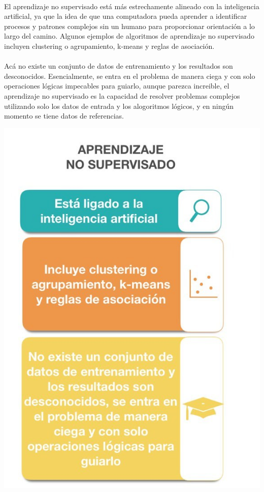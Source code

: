 \documentclass[11pt,a4paper]{article}
\begin{document}
		\\El aprendizaje no supervisado está más estrechamente alineado con la inteligencia artificial, ya que la idea de que una computadora pueda aprender a identificar procesos y patrones complejos sin un humano para proporcionar orientación a lo largo del camino. Algunos ejemplos de algoritmos de aprendizaje no supervisado incluyen clustering o agrupamiento, k-means y reglas de asociación.\\

        \\Acá no existe un conjunto de datos de entrenamiento y los resultados son desconocidos. Esencialmente, se entra en el problema de manera ciega y con solo operaciones lógicas impecables para guiarlo, aunque parezca increible, el aprendizaje no supervisado es la capacidad de resolver problemas complejos utilizando solo los datos de entrada y los alogoritmos lógicos, y en ningún momento se tiene datos de referencias.\\
		
		\begin{center}
		\includegraphics[scale=1.0]{./Imagenes/AprendisajeNoSupervisado}
		\end{center}
		
\end{document}
